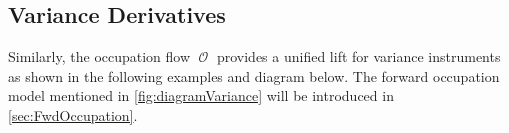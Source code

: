 \documentclass[11pt]{article}
\theoremstyle{plain}
\theoremstyle{definition}
\DeclareMathOperator{\R}{\mathbb{R}}
\DeclareMathOperator{\calO}{\mathcal{O}}
\newcommand{\bb}[1]{\textcolor{blue}{#1}}
\begin{document}











\subsection{Variance Derivatives}\label{sec:varDerivatives}
Similarly, the occupation flow $\calO$ provides a unified lift for variance instruments as shown in the following examples and diagram below. The forward occupation model mentioned in \cref{fig:diagramVariance} will be introduced in \cref{sec:FwdOccupation}.   %
 
\end{document}
